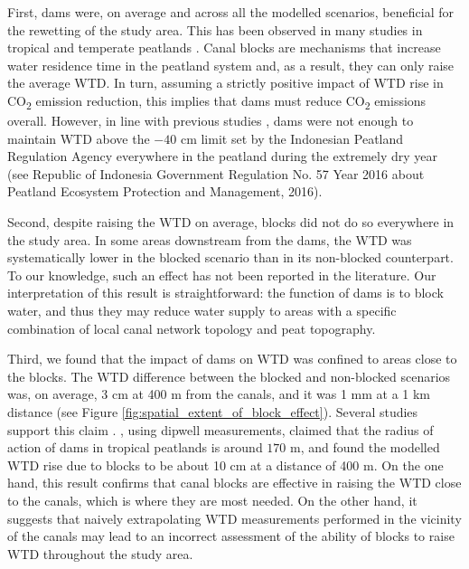 \documentclass[bg, manuscript]{copernicus}
\begin{document}
First, dams were, on average and across all the modelled scenarios, beneficial for the rewetting of the study area.
This has been observed in many studies in tropical and temperate peatlands \citep{putraEffectsDitchDams2021, sutiknoEffectivenessCanalBlocking2019, sutiknoWaterManagementHydrological2020, holdenImpactDitchBlocking2017, planas-clarkeEffectWaterTable2020, schimelpfenigEffectivenessDitchBlockage2014, kasihRewettingDegradedTropical2016}.
Canal blocks are mechanisms that increase water residence time in the peatland system and, as a result, they can only raise the average WTD.
In turn, assuming a strictly positive impact of WTD rise in CO\textsubscript{2} emission reduction, this implies that dams must reduce CO\textsubscript{2} emissions overall.
However, in line  with previous studies \citep{putraEffectsDitchDams2021, putraModellingPerformanceBunds2022}, dams were not enough to maintain WTD above the $-40$ \unit{cm} limit set by the Indonesian Peatland Regulation Agency  everywhere in the peatland during the extremely dry year (see Republic of Indonesia Government Regulation No. 57 Year 2016 about Peatland Ecosystem Protection and Management, 2016).

Second, despite raising the WTD on average, blocks did not do so everywhere in the study area.
In some areas downstream from the dams, the WTD was systematically lower in the blocked scenario than in its non-blocked counterpart.
To our knowledge, such an effect has not been reported in the literature.
Our interpretation of this result is straightforward: the function of dams is to block water, and thus they may reduce water supply to areas with a specific combination of local canal network topology and peat topography.

Third, we found that the impact of dams on WTD was  confined to areas close to the blocks.
The WTD difference between the blocked and non-blocked scenarios was, on average, 3 \unit{cm} at 400 \unit{m} from the canals, and it was 1 \unit{mm} at a 1 \unit{km} distance (see Figure \ref{fig:spatial_extent_of_block_effect}).
Several studies support this claim \citep{sutiknoEffectivenessCanalBlocking2019, sutiknoWaterManagementHydrological2020, evansRatesSpatialVariability2019, putraEffectsDitchDams2021, putraModellingPerformanceBunds2022, ishiiGroundwaterPeatland2016, jaenickePlanningHydrologicalRestoration2010}.
\cite{sutiknoEffectivenessCanalBlocking2019}, using dipwell measurements, claimed that the radius of action of dams in tropical peatlands is around $170$ \unit{m}, and  \cite{ishiiGroundwaterPeatland2016} found the modelled WTD rise due to blocks to be about 10 \unit{cm} at a distance of 400 \unit{m}.
On the one hand, this result confirms that canal blocks are effective in raising the WTD close to the canals, which is where they are most needed.
On the other hand, it suggests that naively extrapolating WTD measurements performed in the vicinity of the canals may lead to an incorrect assessment of the ability of blocks to raise WTD throughout the study area.
\end{document}
